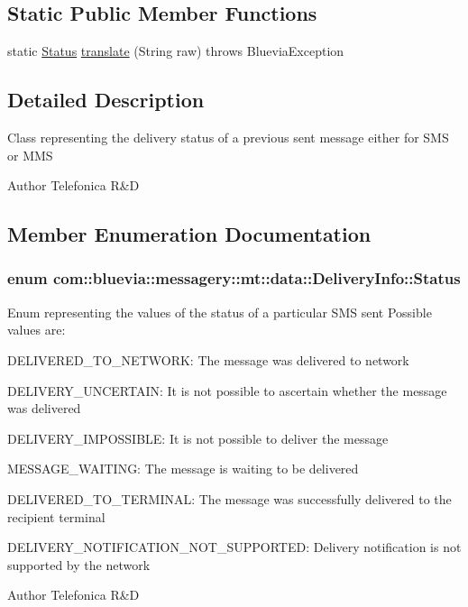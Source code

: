 \subsection*{Static Public Member Functions}
\begin{DoxyCompactItemize}
\item 
static \hyperlink{classcom_1_1bluevia_1_1messagery_1_1mt_1_1data_1_1DeliveryInfo_a37e8b97cdabdb2ac55c095e44cd8e32f}{Status} \hyperlink{classcom_1_1bluevia_1_1messagery_1_1mt_1_1data_1_1DeliveryInfo_afee1bb9b2ced854cf641e18a7c3eb7f0}{translate} (String raw)  throws BlueviaException 
\end{DoxyCompactItemize}


\subsection{Detailed Description}
Class representing the delivery status of a previous sent message either for SMS or MMS

\begin{DoxyAuthor}{Author}
Telefonica R\&D 
\end{DoxyAuthor}


\subsection{Member Enumeration Documentation}
\hypertarget{classcom_1_1bluevia_1_1messagery_1_1mt_1_1data_1_1DeliveryInfo_a37e8b97cdabdb2ac55c095e44cd8e32f}{
\subsubsection[{Status}]{\setlength{\rightskip}{0pt plus 5cm}enum {\bf com::bluevia::messagery::mt::data::DeliveryInfo::Status}}}
\label{classcom_1_1bluevia_1_1messagery_1_1mt_1_1data_1_1DeliveryInfo_a37e8b97cdabdb2ac55c095e44cd8e32f}
Enum representing the values of the status of a particular SMS sent Possible values are: 
\begin{DoxyItemize}
\item DELIVERED\_\-TO\_\-NETWORK: The message was delivered to network 
\item DELIVERY\_\-UNCERTAIN: It is not possible to ascertain whether the message was delivered 
\item DELIVERY\_\-IMPOSSIBLE: It is not possible to deliver the message 
\item MESSAGE\_\-WAITING: The message is waiting to be delivered 
\item DELIVERED\_\-TO\_\-TERMINAL: The message was successfully delivered to the recipient terminal 
\item DELIVERY\_\-NOTIFICATION\_\-NOT\_\-SUPPORTED: Delivery notification is not supported by the network 
\end{DoxyItemize}\begin{DoxyAuthor}{Author}
Telefonica R\&D 
\end{DoxyAuthor}


